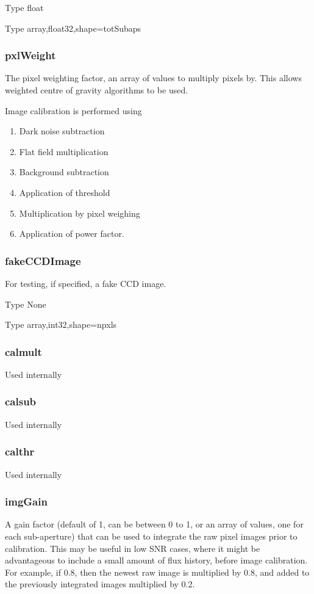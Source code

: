\documentclass[a4,10pt]{article}
\begin{document}
Type float

Type array,float32,shape=totSubaps

\subsubsection{pxlWeight}
The pixel weighting factor, an array of values to multiply pixels by.
This allows weighted centre of gravity algorithms to be used.

Image calibration is performed using
\begin{enumerate}
\item Dark noise subtraction
\item Flat field multiplication
\item Background subtraction
\item Application of threshold
\item Multiplication by pixel weighing
\item Application of power factor.
\end{enumerate}

\subsubsection{fakeCCDImage}
For testing, if specified, a fake CCD image.

Type None

Type array,int32,shape=npxls

\subsubsection{calmult}
Used internally
\subsubsection{calsub}
Used internally
\subsubsection{calthr}
Used internally

\subsubsection{imgGain}
A gain factor (default of 1, can be between 0 to 1, or an array of
values, one for each sub-aperture) that can be used to integrate the
raw pixel images prior to calibration.  This may be useful in low SNR
cases, where it might be advantageous to include a small amount of
flux history, before image calibration.  For example, if 0.8, then the
newest raw image is multiplied by 0.8, and added to the previously
integrated images multiplied by 0.2.
\end{document}

